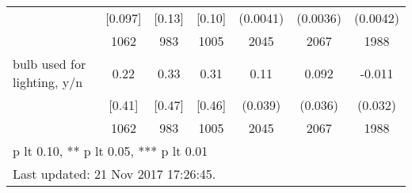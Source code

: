 \begin{table}[htbp]
\begin{tabular*}{1\hsize}{@{\hskip\tabcolsep\extracolsep\fill}l*{1}{cccccc}}
                                &  [0.097]&   [0.13]&   [0.10]& (0.0041)         & (0.0036)         & (0.0042)         \\
                                &     1062&      983&     1005&     2045         &     2067         &     1988         \\
bulb used for lighting, y/n     &     0.22&     0.33&     0.31&     0.11\sym{***}&    0.092\sym{**} &   -0.011         \\
                                &   [0.41]&   [0.47]&   [0.46]&  (0.039)         &  (0.036)         &  (0.032)         \\
                                &     1062&      983&     1005&     2045         &     2067         &     1988         \\
\bottomrule
\multicolumn{7}{l}{\footnotesize * p lt 0.10, ** p lt 0.05, *** p lt 0.01}\\
\multicolumn{7}{l}{\footnotesize Last updated: 21 Nov 2017 17:26:45.}\\
\end{tabular*}
\end{table}
